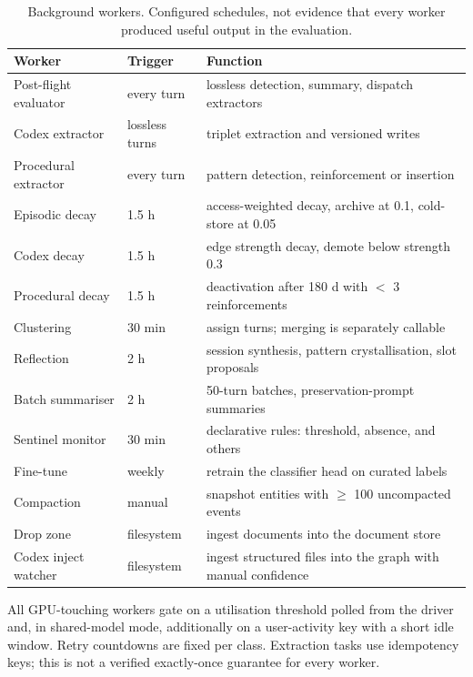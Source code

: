 \documentclass[twoside,11pt]{article}
\begin{document}
\begin{table}[tbp]
\centering
\small


\begin{tabular}{@{}L{3.2cm}L{2.6cm}L{7.4cm}@{}}
\toprule
\textbf{Worker} & \textbf{Trigger} & \textbf{Function} \\
\midrule
Post-flight evaluator & every turn & lossless detection, summary, dispatch extractors \\
Codex extractor       & lossless turns  & triplet extraction and versioned writes \\
Procedural extractor  & every turn      & pattern detection, reinforcement or insertion \\
Episodic decay        & 1.5 h           & access-weighted decay, archive at 0.1, cold-store at 0.05 \\
Codex decay           & 1.5 h           & edge strength decay, demote below strength 0.3 \\
Procedural decay      & 1.5 h           & deactivation after 180 d with $<$ 3 reinforcements \\
Clustering            & 30 min          & assign turns; merging is separately callable \\
Reflection            & 2 h             & session synthesis, pattern crystallisation, slot proposals \\
Batch summariser      & 2 h             & 50-turn batches, preservation-prompt summaries \\
Sentinel monitor      & 30 min          & declarative rules: threshold, absence, and others \\
Fine-tune             & weekly          & retrain the classifier head on curated labels \\
Compaction            & manual          & snapshot entities with $\geq$ 100 uncompacted events \\
Drop zone             & filesystem      & ingest documents into the document store \\
Codex inject watcher  & filesystem      & ingest structured files into the graph with manual confidence \\
\bottomrule
\end{tabular}
\caption{Background workers. Configured schedules, not evidence that every worker produced useful output in the evaluation.}
\label{tab:workers}
\end{table}

All GPU-touching workers gate on a utilisation threshold polled from the driver and, in shared-model mode, additionally on a user-activity key with a short idle window. Retry countdowns are fixed per class. Extraction tasks use idempotency keys; this is not a verified exactly-once guarantee for every worker.
\end{document}
